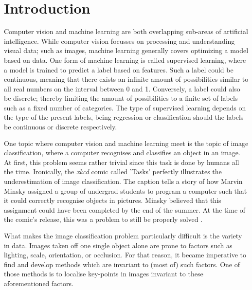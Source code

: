 \documentclass[12pt,a4paper,oneside]{paper}
\begin{document}
\pagestyle{plain}


\def\title {Final Lab - Part I}

 
\cleardoublepage
{}\selectfont
\setcounter{page}{0}
\tableofcontents
\newpage

\small

\section{Introduction}
Computer vision and machine learning are both overlapping sub-areas of artificial intelligence.
While computer vision focusses on processing and understanding visual data; such as images, machine learning generally covers optimizing a model based on data.
One form of machine learning is called supervised learning, where a model is trained to predict a label based on features.
Such a label could be continuous, meaning that there exists an infinite amount of possibilities similar to all real numbers on the interval between 0 and 1.
Conversely, a label could also be discrete; thereby limiting the amount of possibilities to a finite set of labels such as a fixed number of categories.
The type of supervised learning depends on the type of the present labels, being regression or classification should the labels be continuous or discrete respectively.

One topic where computer vision and machine learning meet is the topic of image classification, where a computer recognises and classifies an object in an image. At first, this problem seems rather trivial since this task is done by humans all the time.
Ironically, the \textit{xkcd} comic called 'Tasks' perfectly illustrates the underestimation of image classification. 
The caption tells a story of how Marvin Minsky assigned a group of undergrad students to program a computer such that it could correctly recognise objects in pictures.
Minsky believed that this assignment could have been completed by the end of the summer. 
At the time of the comic's release, this was a problem to still be properly solved .

What makes the image classification problem particularly difficult is the variety in data.
Images taken off one single object alone are prone to factors such as lighting, scale, orientation, or occlusion.
For that reason, it became imperative to find and develop methods which are invariant to (most of) such factors.
One of those methods is to localise key-points in images invariant to these aforementioned factors.
\end{document}
